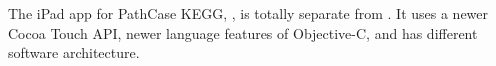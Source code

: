 The iPad app for PathCase KEGG, \keggapp, is totally separate from \mawapp. It
uses a newer Cocoa Touch API, newer language features of Objective-C, and has
different software architecture.








